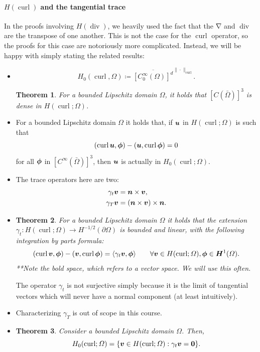 \documentclass{article}
\renewcommand{\vec}{\vectorsym}
\DeclareMathOperator{\grad}{\nabla}
\DeclareMathOperator{\dive}{\text{div}}
\DeclareMathOperator{\curl}{\text{curl}}
\newtheorem{theorem}{Theorem}
\begin{document}
\paragraph{$H(\curl)$ and the tangential trace} In the proofs involving $H(\dive)$, we heavily used the fact that the $\grad$ and $\dive$ are the transpose of one another. This is not the case for the $\curl$ operator, so the proofs for this case are notoriously more complicated. Instead, we will be happy with simply stating the related results:
    \begin{itemize}
        \item $$ H_0(\curl, \Omega) \coloneqq \overline{[C_0^\infty(\Omega)]^d}^{\|\cdot\|_{\curl}}. $$
        \begin{theorem}
            For a bounded Lipschitz domain $\Omega$, it holds that $[C(\bar\Omega)]^3$ is dense in $H(\curl;\Omega)$.
        \end{theorem}
        \item For a bounded Lipschitz domain $\Omega$ it holds that, if $\vec u$ in $H(\curl;\Omega)$ is such that
            $$ (\curl \vec u, \vec \phi) - ( \vec u, \curl \vec \phi) = 0$$
        for all $\vec \phi$ in $[C^\infty(\bar\Omega)]^3$, then $\vec u$ is actually in $H_0(\curl;\Omega)$.
        \item The trace operators here are two: 
            \begin{align*}
                \gamma_t \vec v &= \vec n \times \vec v, \\
                \gamma_T \vec v &= (\vec n \times \vec v) \times \vec n. 
            \end{align*}
        \item 
        \begin{theorem}
            For a bounded Lipschitz domain $\Omega$ it holds that the extension $\gamma_t: H(\curl;\Omega) \to H^{-1/2}(\partial\Omega)$ is bounded and linear, with the following integration by parts formula: 
                $$ (\curl \vec v, \vec\phi) - (\vec v, \curl\vec \phi) = \langle \gamma_t \vec v, \vec \phi\rangle \qquad\forall \vec v \in H(\curl;\Omega), \vec\phi \in \vec H^1(\Omega). $$
            **Note the bold space, which refers to a vector space. We will use this often. 
        \end{theorem}
        The operator $\gamma_t$ is not surjective simply because it is the limit of tangential vectors which will never have a normal component (at least intuitively). 
        \item Characterizing $\gamma_T$ is out of scope in this course. 
        \item 
        \begin{theorem}
            Consider a bounded Lipschitz domain $\Omega$. Then, 
                $$ H_0(\curl;\Omega) = \{ \vec v \in H(\curl;\Omega): \gamma_t \vec v = \vec 0\}. $$
        \end{theorem}
    \end{itemize}
\end{document}
